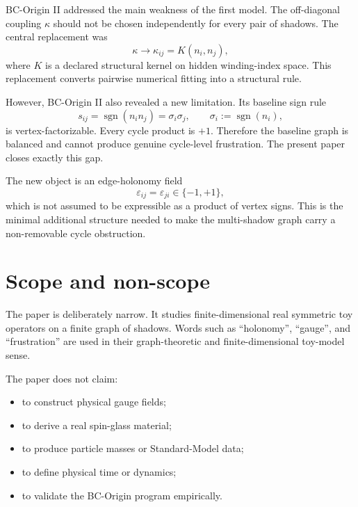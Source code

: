 \documentclass[11pt]{article}
\newcommand{\sgn}{\operatorname{sgn}}
\begin{document}
BC-Origin II addressed the main weakness of the first model. The off-diagonal coupling $\kappa$ should not be chosen independently for every pair of shadows. The central replacement was
\begin{equation}
 \kappa\longrightarrow \kappa_{ij}=K(n_i,n_j),
\end{equation}
where $K$ is a declared structural kernel on hidden winding-index space. This replacement converts pairwise numerical fitting into a structural rule.

However, BC-Origin II also revealed a new limitation. Its baseline sign rule
\begin{equation}
 s_{ij}=\sgn(n_i n_j)=\sigma_i\sigma_j,
 \qquad \sigma_i:=\sgn(n_i),
\end{equation}
is vertex-factorizable. Every cycle product is $+1$. Therefore the baseline graph is balanced and cannot produce genuine cycle-level frustration. The present paper closes exactly this gap.

The new object is an edge-holonomy field
\begin{equation}
 \varepsilon_{ij}=\varepsilon_{ji}\in\{-1,+1\},
\end{equation}
which is not assumed to be expressible as a product of vertex signs. This is the minimal additional structure needed to make the multi-shadow graph carry a non-removable cycle obstruction.

\section{Scope and non-scope}

The paper is deliberately narrow. It studies finite-dimensional real symmetric toy operators on a finite graph of shadows. Words such as ``holonomy'', ``gauge'', and ``frustration'' are used in their graph-theoretic and finite-dimensional toy-model sense.

The paper does not claim:
\begin{itemize}[leftmargin=2em]
\item to construct physical gauge fields;
\item to derive a real spin-glass material;
\item to produce particle masses or Standard-Model data;
\item to define physical time or dynamics;
\item to validate the BC-Origin program empirically.
\end{itemize}
\end{document}
